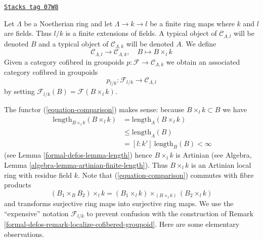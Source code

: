 \begin{definition}
\label{formal-defos-situation-change-of-fields}
\href{https://stacks.math.columbia.edu/tag/07W8}{\texttt{Stacks tag 07W8}}

Let $\Lambda$ be a Noetherian ring and let $\Lambda \to k \to l$ be a finite
ring maps where $k$ and $l$ are fields. Thus $l/k$ is a finite
extensions of fields. A typical object of $\mathcal{C}_{\Lambda, l}$ will be
denoted $B$ and a typical object of $\mathcal{C}_{\Lambda, k}$ will be
denoted $A$. We define
\begin{equation}
\label{equation-comparison}
\mathcal{C}_{\Lambda, l} \longrightarrow \mathcal{C}_{\Lambda, k},
\quad
B \longmapsto B \times_l k
\end{equation}
Given a category cofibred in groupoids
$p : \mathcal{F} \to \mathcal{C}_{\Lambda, k}$ we obtain
an associated category cofibred in groupoids
$$
p_{l/k} : \mathcal{F}_{l/k} \longrightarrow \mathcal{C}_{\Lambda, l}
$$
by setting $\mathcal{F}_{l/k}(B) = \mathcal{F}(B \times_l k)$.
\end{definition}

The functor (\ref{equation-comparison}) makes sense:
because $B \times_l k \subset B$ we have
\begin{align*}
[k : k']\ \text{length}_{B \times_l k}(B \times_l k) & =
\text{length}_\Lambda(B \times_l k) \\
& \leq \text{length}_\Lambda(B) \\
& = [l : k']\ \text{length}_B(B) < \infty
\end{align*}
(see Lemma \ref{formal-defos-lemma-length}) hence $B \times_l k$ is Artinian
(see Algebra, Lemma \ref{algebra-lemma-artinian-finite-length}).
Thus $B \times_l k$ is an Artinian local ring with
residue field $k$. Note that (\ref{equation-comparison})
commutes with fibre products
$$
(B_1 \times_B B_2) \times_l k =
(B_1 \times_l k) \times_{(B \times_l k)} (B_2 \times_l k)
$$
and transforms surjective ring maps into surjective ring maps.
We use the ``expensive'' notation $\mathcal{F}_{l/k}$ to prevent confusion
with the construction of Remark \ref{formal-defos-remark-localize-cofibered-groupoid}.
Here are some elementary observations.

